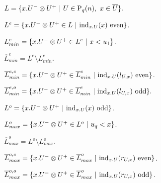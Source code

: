 \begin{minipage}{.8\textwidth}
	$L = \{x.U^- \otimes U^+\ | \ U \in \mathrm{P}_q(n),\ x \in \overline{U}\}$. \\
	\begin{tab}
		$L^{e} = \{x.U^- \tensor U^+ \in L\ | \ \ind_{x.U}(x) \text{ even}\}$. 
		\begin{tab}
			$L_{min}^{e} = \{x.U^- \tensor U^+ \in L^e\ | \ x < u_1 \}$.\par
			$\overline{L}_{min}^{e} = L^{e} \setminus L_{min}^{e}$.
			\begin{tab}
				$\overline{L}_{min}^{e,e} = \{ x.U^- \otimes U^+ \in \overline{L}_{min}^{e}\ | \ \mathrm{ind}_{x.U}(l_{U,x}) \text{ even} \}$.\par
				$\overline{L}_{min}^{e,o} = \{ x.U^- \otimes U^+ \in \overline{L}_{min}^{e}\ | \ \mathrm{ind}_{x.U}(l_{U,x}) \text{ odd} \}.$ \\
			\end{tab}
		\end{tab}
		$L^{o} = \{x.U^- \tensor U^+\ | \ \ind_{x.U}(x) \text{ odd}\}$.\par 
		\begin{tab}
			$L_{max}^{o} = \{x.U^- \tensor U^+ \in L^o\ | \ u_q < x \}$.\par
			$\overline{L}_{max}^{o} = L^{o}\setminus L_{max}^{o}$.
			\begin{tab}
				$\overline{L}_{max}^{o,e} = \{ x.U^- \otimes U^+ \in \overline{L}_{max}^{o}\ | \ \mathrm{ind}_{x.U}(r_{U,x}) \text{ even} \}$.\par 
				$\overline{L}_{max}^{o,o} = \{ x.U^- \otimes U^+ \in \overline{L}_{max}^{o}\ | \ \mathrm{ind}_{x.U}(r_{U,x}) \text{ odd} \}$.
			\end{tab}
		\end{tab}
	\end{tab}
\end{minipage}

